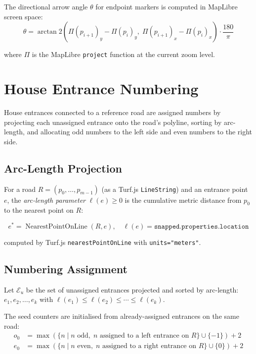 \documentclass[12pt,a4paper]{article}
\theoremstyle{definition}
\theoremstyle{plain}
\theoremstyle{remark}
\begin{document}
The directional arrow angle $\theta$ for endpoint markers is computed in
MapLibre screen space:
\begin{equation}
  \theta = \arctan2\!\left(
    \Pi(p_{i+1})_y - \Pi(p_i)_y,\;
    \Pi(p_{i+1})_x - \Pi(p_i)_x
  \right) \cdot \frac{180}{\pi}
  \label{eq:bearing}
\end{equation}

where $\Pi$ is the MapLibre \texttt{project} function at the current zoom level.

\section{House Entrance Numbering}
\label{sec:house_numbering}

House entrances connected to a reference road are assigned numbers by
projecting each unassigned entrance onto the road's polyline, sorting
by arc-length, and allocating odd numbers to the left side and even
numbers to the right side.

\subsection{Arc-Length Projection}

For a road $R = (p_0, \ldots, p_{m-1})$ (as a Turf.js \texttt{LineString})
and an entrance point $e$, the \emph{arc-length parameter}
$\ell(e) \geq 0$ is the cumulative metric distance from $p_0$ to the
nearest point on $R$:

\begin{equation}
  e^* = \operatorname{NearestPointOnLine}(R, e), \quad
  \ell(e) = \texttt{snapped.properties.location}
  \label{eq:arc_length}
\end{equation}

computed by Turf.js \texttt{nearestPointOnLine} with \texttt{units="meters"}.

\subsection{Numbering Assignment}

Let $\mathcal{E}_u$ be the set of unassigned entrances projected and sorted
by arc-length: $e_1, e_2, \ldots, e_k$ with
$\ell(e_1) \leq \ell(e_2) \leq \cdots \leq \ell(e_k)$.

The seed counters are initialised from already-assigned entrances on the
same road:
\begin{align}
  o_0 &= \max\!\left(\{n \mid n \text{ odd},\;
    n \text{ assigned to a left entrance on } R\} \cup \{-1\}\right) + 2
  \label{eq:odd_seed} \\
  e_0 &= \max\!\left(\{n \mid n \text{ even},\;
    n \text{ assigned to a right entrance on } R\} \cup \{0\}\right) + 2
  \label{eq:even_seed}
\end{align}
\end{document}
